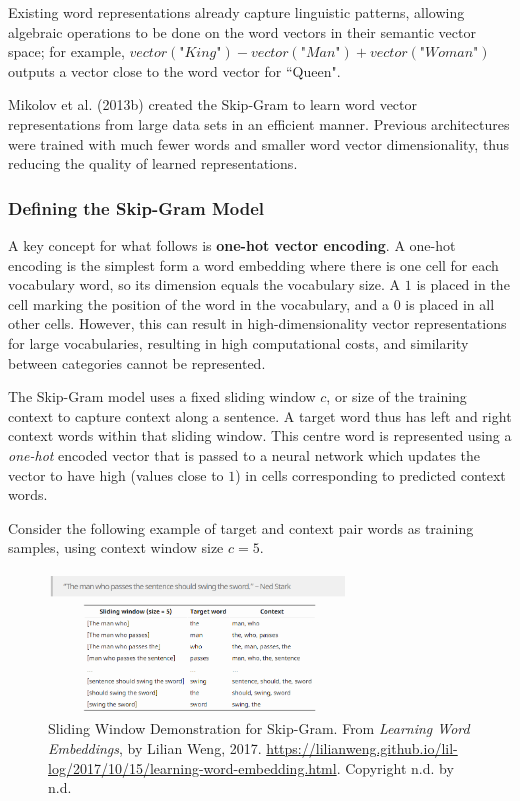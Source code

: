 Existing word representations already capture linguistic patterns, allowing algebraic operations to be done on the word vectors in their semantic vector space; for example, $vector(\textit{"King"}) - vector(\textit{"Man"}) + vector(\textit{"Woman"})$ outputs a vector close to the word vector for ``Queen".

Mikolov et al. (2013b) created the Skip-Gram to learn word vector representations from large data sets in an efficient manner. Previous architectures were trained with much fewer words and smaller word vector dimensionality, thus reducing the quality of learned representations. 

\subsubsection{Defining the Skip-Gram Model}

A key concept for what follows is \textbf{one-hot vector encoding}. A one-hot encoding is the simplest form a word embedding where there is one cell for each vocabulary word, so its dimension equals the vocabulary size. A $1$ is placed in the cell marking the position of the word in the vocabulary, and a $0$ is placed in all other cells. However, this can result in high-dimensionality vector representations for large vocabularies, resulting in high computational costs, and similarity between categories cannot be represented. 

The Skip-Gram model uses a fixed sliding window $c$, or size of the training context to capture context along a sentence. A target word thus has left and right context words within that sliding window. This centre word is represented using a \emph{one-hot} encoded vector that is passed to a neural network which updates the vector to have high (values close to $1$) in cells corresponding to predicted context words. 

Consider the following example of target and context pair words as training samples, using context window size $c = 5$. 

\begin{figure}[h]
\centering
\includegraphics[width=0.7\textwidth]{imgs/skipgram_quote.png}
\caption{Sliding Window Demonstration for Skip-Gram. From \emph{Learning Word Embeddings}, by Lilian Weng, 2017. \url{https://lilianweng.github.io/lil-log/2017/10/15/learning-word-embedding.html}. Copyright n.d. by n.d.}
\end{figure}

